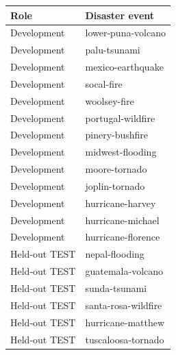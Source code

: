 \begin{tabular}{ll}
\toprule
Role & Disaster event \\
\midrule
Development & lower-puna-volcano \\
Development & palu-tsunami \\
Development & mexico-earthquake \\
Development & socal-fire \\
Development & woolsey-fire \\
Development & portugal-wildfire \\
Development & pinery-bushfire \\
Development & midwest-flooding \\
Development & moore-tornado \\
Development & joplin-tornado \\
Development & hurricane-harvey \\
Development & hurricane-michael \\
Development & hurricane-florence \\
Held-out TEST & nepal-flooding \\
Held-out TEST & guatemala-volcano \\
Held-out TEST & sunda-tsunami \\
Held-out TEST & santa-rosa-wildfire \\
Held-out TEST & hurricane-matthew \\
Held-out TEST & tuscaloosa-tornado \\
\bottomrule
\end{tabular}
